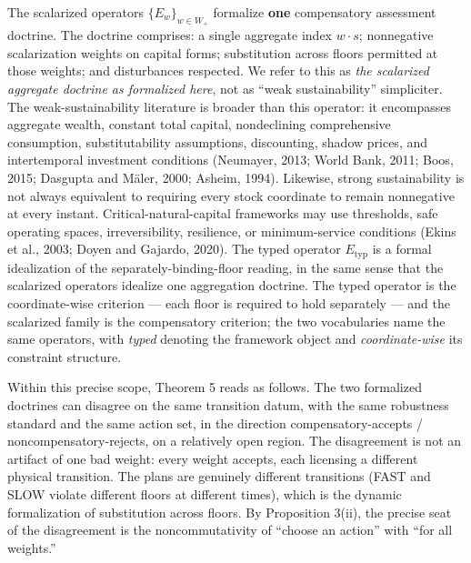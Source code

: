 \documentclass[review,11pt]{elsarticle}
\begin{document}
The scalarized operators \(\{E_w\}_{w \in W_+}\) formalize \textbf{one}
compensatory assessment doctrine. The doctrine comprises: a single
aggregate index \(w \cdot s\); nonnegative scalarization weights on
capital forms; substitution across floors permitted at those weights;
and disturbances respected. We refer to this as \emph{the scalarized
aggregate doctrine as formalized here}, not as ``weak sustainability''
simpliciter. The weak-sustainability literature is broader than this
operator: it encompasses aggregate wealth, constant total capital,
nondeclining comprehensive consumption, substitutability assumptions,
discounting, shadow prices, and intertemporal investment conditions
(Neumayer, 2013; World Bank, 2011; Boos, 2015; Dasgupta and M\"aler, 2000;
Asheim, 1994). Likewise, strong sustainability is not always equivalent
to requiring every stock coordinate to remain nonnegative at every
instant. Critical-natural-capital frameworks may use thresholds, safe
operating spaces, irreversibility, resilience, or minimum-service
conditions (Ekins et al., 2003; Doyen and Gajardo, 2020). The typed
operator \(E_{\mathrm{typ}}\) is a formal idealization of the
separately-binding-floor reading, in the same sense that the scalarized
operators idealize one aggregation doctrine. The typed operator is the
coordinate-wise criterion --- each floor is required to hold separately ---
and the scalarized family is the compensatory criterion; the two vocabularies
name the same operators, with \emph{typed} denoting the framework object and
\emph{coordinate-wise} its constraint structure.

Within this precise scope, Theorem 5 reads as follows. The two
formalized doctrines can disagree on the same transition datum, with the
same robustness standard and the same action set, in the direction
compensatory-accepts / noncompensatory-rejects, on a relatively open
region. The disagreement is not an artifact of one bad weight: every
weight accepts, each licensing a different physical transition. The
plans are genuinely different transitions (FAST and SLOW violate
different floors at different times), which is the dynamic formalization
of substitution across floors. By Proposition 3(ii), the precise seat of
the disagreement is the noncommutativity of ``choose an action'' with
``for all weights.''
\end{document}
